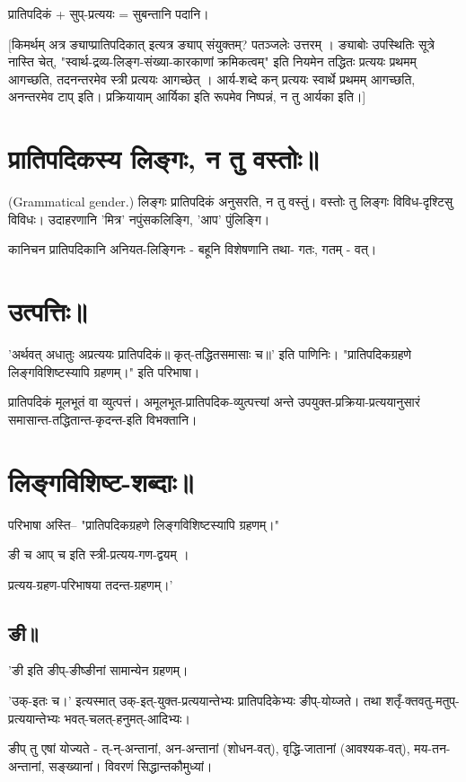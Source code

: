 \documentclass[oneside, article]{memoir}
\begin{document}
प्रातिपदिकं + सुप्-प्रत्ययः = सुबन्तानि पदानि।

[किमर्थम् अत्र ङ्याप्प्रातिपदिकात् इत्यत्र ङ्याप् संयुक्तम्? पतञ्जलेः उत्तरम् । ङ्याबोः उपस्थितिः सूत्रे नास्ति चेत्‌, "स्वार्थ-द्रव्य-लिङ्ग-संख्या-कारकाणां क्रमिकत्वम्‌" इति नियमेन तद्धितः प्रत्ययः प्रथमम्‌ आगच्छति, तदनन्तरमेव स्त्री प्रत्ययः आगच्छेत्‌ । आर्य-शब्दे कन्‌ प्रत्ययः स्वार्थे प्रथमम्‌ आगच्छति, अनन्तरमेव टाप्‌ इति। प्रक्रियायाम्‌ आर्यिका इति रूपमेव निष्पन्नं, न तु आर्यका इति।]

\section{प्रातिपदिकस्य लिङ्गः, न तु वस्तोः॥}
(Grammatical gender.) लिङ्गः प्रातिपदिकं अनुसरति, न तु वस्तुं। वस्तोः तु लिङ्गः विविध-दृश्टिसु विविधः। उदाहरणानि 'मित्र' नपुंसकलिङ्गि, 'आप' पुंलिङ्गि।

कानिचन प्रातिपदिकानि अनियत-लिङ्गिनः - बहूनि विशेषणानि तथा- गतः, गतम् - वत्।

\section{उत्पत्तिः॥}
'अर्थवत् अधातुः अप्रत्ययः प्रातिपदिकं॥ कृत्-तद्धितसमासाः च॥' इति पाणिनिः। "प्रातिपदिकग्रहणे लिङ्गविशिष्टस्यापि ग्रहणम्‌।" इति परिभाषा।

प्रातिपदिकं मूलभूतं वा व्युत्पत्तं। अमूलभूत-प्रातिपदिक-व्युत्पत्त्यां अन्ते उपयुक्त-प्रक्रिया-प्रत्ययानुसारं समासान्त-तद्धितान्त-कृदन्त-इति विभक्तानि।

\section{लिङ्गविशिष्ट-शब्दाः॥}
परिभाषा अस्ति-- "प्रातिपदिकग्रहणे लिङ्गविशिष्टस्यापि ग्रहणम्‌।"

ङी च आप् च इति स्त्री-प्रत्यय-गण-द्वयम् ।

प्रत्यय-ग्रहण-परिभाषया तदन्त-ग्रहणम्।'

\subsection{ङी॥}
'ङी इति ङीप्-ङीष्ङीनां सामान्येन ग्रहणम्। 

'उक्-इतः च।' इत्यस्मात् उक्-इत्-युक्त-प्रत्ययान्तेभ्यः प्रातिपदिकेभ्यः ङीप्-योय्जते। तथा शतृँ-क्तवतु-मतुप्-प्रत्ययान्तेभ्यः भवत्-चलत्-हनुमत्-आदिभ्यः।

ङीप् तु एषां योज्यते - त्-न्-अन्तानां, अन-अन्तानां (शोधन-वत्), वृद्धि-जातानां (आवश्यक-वत्), मय-तन-अन्तानां, सङ्ख्यानां। विवरणं सिद्धान्तकौमुध्यां।
\end{document}
